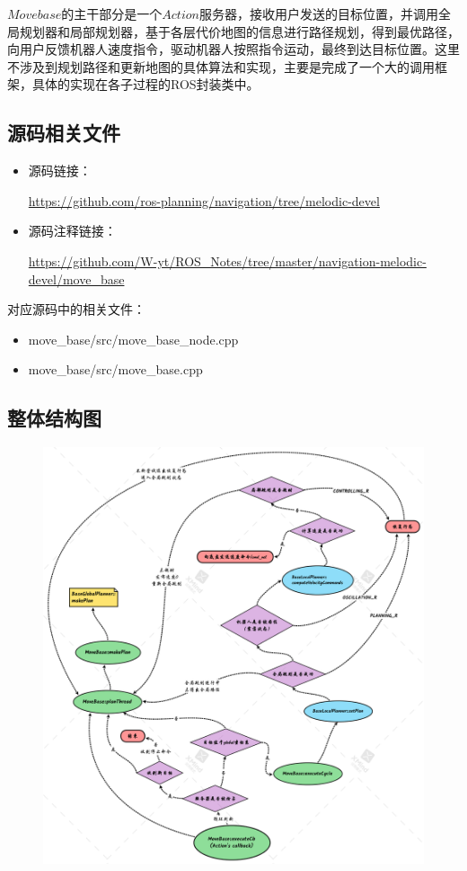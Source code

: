 \documentclass[9pt, oneside]{book}
\begin{document}
$Movebase$的主干部分是一个$Action$服务器，接收用户发送的目标位置，并调用全局规划器和局部规划器，基于各层代价地图的信息进行路径规划，得到最优路径，向用户反馈机器人速度指令，驱动机器人按照指令运动，最终到达目标位置。这里不涉及到规划路径和更新地图的具体算法和实现，主要是完成了一个大的调用框架，具体的实现在各子过程的ROS封装类中。

\subsection{源码相关文件}

\begin{itemize}
    \item 源码链接：
    
    \url{https://github.com/ros-planning/navigation/tree/melodic-devel}

    \item 源码注释链接：
    
    \url{https://github.com/W-yt/ROS_Notes/tree/master/navigation-melodic-devel/move_base}
\end{itemize}

对应源码中的相关文件：

\begin{itemize}
    \item move\_base/src/move\_base\_node.cpp
    \item move\_base/src/move\_base.cpp
\end{itemize}

\subsection{整体结构图}

\begin{figure}[H]
    \centering
    \includegraphics[width=1.0\linewidth]{image/move_base.png}
\end{figure}
\end{document}

